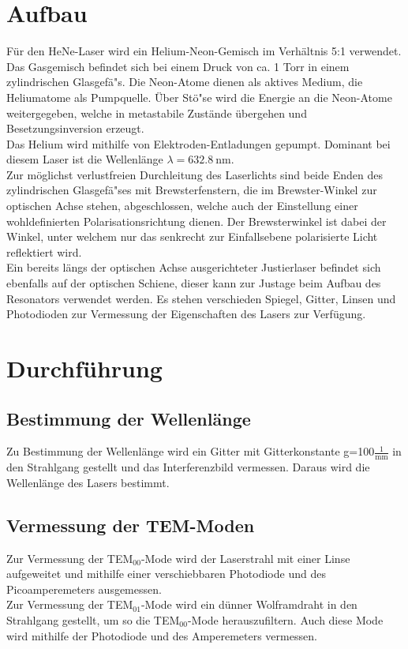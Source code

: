 \documentclass[captions=tableheading]{scrartcl}
\begin{document}
\section{Aufbau}
Für den HeNe-Laser wird ein Helium-Neon-Gemisch im Verhältnis 5:1 verwendet. Das Gasgemisch befindet sich bei einem Druck von ca. 1 Torr in einem zylindrischen Glasgefä"s. Die Neon-Atome dienen als aktives Medium, die Heliumatome als Pumpquelle. Über Stö"se wird die Energie an die Neon-Atome weitergegeben, welche in metastabile Zustände übergehen und Besetzungsinversion erzeugt. \\
Das Helium wird mithilfe von Elektroden-Entladungen gepumpt. Dominant bei diesem Laser ist die Wellenlänge $\lambda=\SI{632.8}{\nano\metre}$.\\
Zur möglichst verlustfreien Durchleitung des Laserlichts sind beide Enden des zylindrischen Glasgefä"ses mit Brewsterfenstern, die im Brewster-Winkel zur optischen Achse stehen, abgeschlossen, welche auch der Einstellung einer wohldefinierten Polarisationsrichtung dienen. Der Brewsterwinkel ist dabei der Winkel, unter welchem nur das senkrecht zur Einfallsebene polarisierte Licht reflektiert wird.\\
Ein bereits längs der optischen Achse ausgerichteter Justierlaser befindet sich ebenfalls auf der optischen Schiene, dieser kann zur Justage beim Aufbau des Resonators verwendet werden. Es stehen verschieden Spiegel, Gitter, Linsen und Photodioden zur Vermessung der Eigenschaften des Lasers zur Verfügung. 

\section{Durchführung}

\subsection{Bestimmung der Wellenlänge}
Zu Bestimmung der Wellenlänge wird ein Gitter mit Gitterkonstante g=100$\frac{1}{\si{\milli\metre}}$ in den Strahlgang gestellt und das Interferenzbild vermessen. Daraus wird die Wellenlänge des Lasers bestimmt.

\subsection{Vermessung der TEM-Moden}
Zur Vermessung der TEM$_{00}$-Mode wird der Laserstrahl mit einer Linse aufgeweitet und mithilfe einer verschiebbaren Photodiode und des Picoamperemeters ausgemessen. \\
Zur Vermessung der TEM$_{01}$-Mode wird ein dünner Wolframdraht in den Strahlgang gestellt, um so die TEM$_{00}$-Mode herauszufiltern. Auch diese Mode wird mithilfe der Photodiode und des Amperemeters vermessen.
\end{document}
